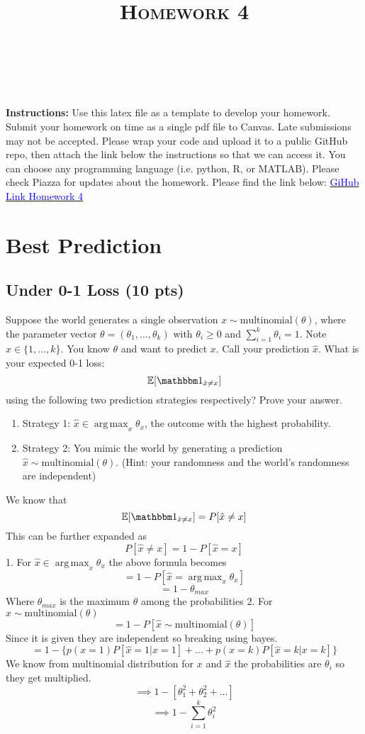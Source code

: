 \documentclass[a4paper]{article}
\title{\textsc{Homework 4}} %
\author{
\red{$>>$Anudeep Kumar$<<$} \\
\red{$>>$9084607069$<<$}\\
}
\date{}
\theoremstyle{definition}
\DeclareMathOperator*{\argmax}{arg\,max}
\def\E{\mathbb E}
\def\ind{\mathbbm 1}
\newenvironment{soln}{
    \leavevmode\color{blue}\ignorespaces
}{}
\begin{document}
\maketitle 


\textbf{Instructions:} Use this latex file as a template to develop your homework. Submit your homework on time as a single pdf file to Canvas. Late submissions may not be accepted. Please wrap your code and upload it to a public GitHub repo, then attach the link below the instructions so that we can access it. You can choose any programming language (i.e. python, R, or MATLAB). Please check Piazza for updates about the homework.
Please find the link below:
\href{https://github.com/anudeepk17/HW4}{\textcolor{blue}{GiHub Link Homework 4}}

\section{Best Prediction}
\subsection{Under 0-1 Loss (10 pts)}
Suppose the world generates a single observation $x \sim \mbox{multinomial}(\theta)$, where the parameter vector $\theta=(\theta_1, \ldots, \theta_k)$ with $\theta_i\ge 0$ and $\sum_{i=1}^k \theta_i=1$.  Note $x \in \{1, \ldots, k\}$.
You know $\theta$ and want to predict $x$. 
Call your prediction $\hat x$.  What is your expected 0-1 loss: 
$$\E[\ind_{\hat x \neq x}]$$
using the following two prediction strategies respectively?  Prove your answer.
\begin{enumerate}
    \item Strategy 1: $\hat x \in \argmax_x \theta_x$, the outcome with the highest probability.
    \item Strategy 2: You mimic the world by generating a prediction $\hat x \sim \mbox{multinomial}(\theta)$.  (Hint: your randomness and the world's randomness are independent)
\end{enumerate}
\begin{soln}
    We know that $$\E[\ind_{\hat x \neq x}]=P[\hat x \neq x]$$
    This can be further expanded as 
    $$P[\hat x \neq x]=1-P[\hat x = x]$$
1. For $\hat x \in \argmax_x \theta_x$ the above formula becomes 
$$ =1-P[\hat x = \argmax_x \theta_x]$$
$$ =1- \theta_{max}$$
Where $\theta_{max} $ is the maximum $\theta$ among the probabilities
2. For $\hat x \sim \mbox{multinomial}(\theta)$
$$ = 1-P[\hat x \sim \mbox{multinomial}(\theta)]$$
Since it is given they are independent so breaking using bayes.
$$ = 1-\{p(x=1)P[\hat x =1 | x =1]+...+p(x=k)P[\hat x=k | x=k]\}$$
We know from multinomial distribution for $x$ and $\hat x $ the probabilities are $\theta_i$ so they get multiplied. 
$$\implies 1-[\theta_1^2 + \theta_2^2 +...]$$
$$\implies 1-\sum_{i=1}^k \theta_i^2$$
\end{soln}
\end{document}
